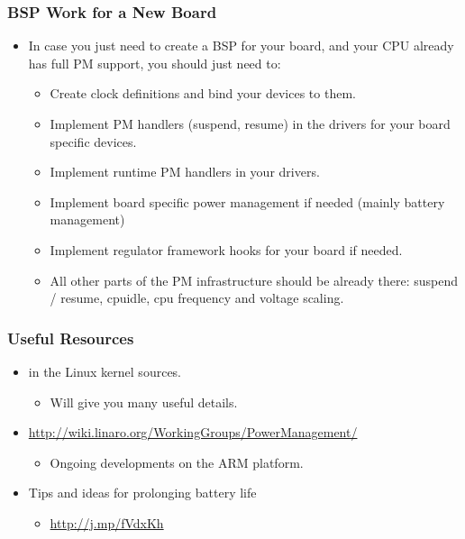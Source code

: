 \begin{frame}
  \frametitle{BSP Work for a New Board}
  \begin{itemize}
  \item In case you just need to create a BSP for your board, and your
    CPU already has full PM support, you should just need to:
    \begin{itemize}
    \item Create clock definitions and bind your devices to them.
    \item Implement PM handlers (suspend, resume) in the drivers for
      your board specific devices.
    \item Implement runtime PM handlers in your drivers.
    \item Implement board specific power management if needed (mainly
      battery management)
    \item Implement regulator framework hooks for your board if
      needed.
    \item All other parts of the PM infrastructure should be already
      there: suspend / resume, cpuidle, cpu frequency and voltage
      scaling.
    \end{itemize}
  \end{itemize}
\end{frame}

\begin{frame}
  \frametitle{Useful Resources}
  \begin{itemize}
  \item {} in the Linux kernel sources.
    \begin{itemize}
    \item Will give you many useful details.
    \end{itemize}
  \item {\small \url{http://wiki.linaro.org/WorkingGroups/PowerManagement/}}
    \begin{itemize}
    \item Ongoing developments on the ARM platform.
    \end{itemize}
  \item Tips and ideas for prolonging battery life
    \begin{itemize}
    \item \url{http://j.mp/fVdxKh}
    \end{itemize}
  \end{itemize}
\end{frame}

